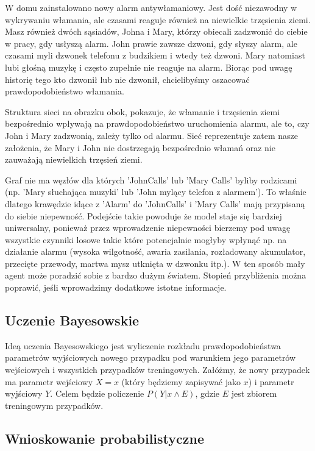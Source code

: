 \documentclass[a4paper,15pt]{article}
\begin{document}
W domu zainstalowano nowy alarm antywłamaniowy. Jest dość niezawodny w wykrywaniu włamania, ale czasami reaguje również na niewielkie trzęsienia ziemi. Masz również dwóch sąsiadów, Johna i Mary, którzy obiecali zadzwonić do ciebie w pracy, gdy usłyszą alarm. John prawie zawsze dzwoni, gdy słyszy alarm, ale czasami myli dzwonek telefonu z budzikiem i wtedy też dzwoni. Mary natomiast lubi głośną muzykę i często zupełnie nie reaguje na alarm. Biorąc pod uwagę historię tego kto dzwonił lub nie dzwonił, chcielibyśmy oszacować prawdopodobieństwo włamania.

Struktura sieci na obrazku obok, pokazuje, że włamanie i trzęsienia ziemi bezpośrednio wpływają na prawdopodobieństwo uruchomienia alarmu, ale to, czy John i Mary zadzwonią, zależy tylko od alarmu. Sieć reprezentuje zatem nasze założenia, że Mary i John nie dostrzegają bezpośrednio włamań oraz nie zauważają niewielkich trzęsień ziemi.

Graf nie ma węzłów dla których 'JohnCalls' lub 'Mary Calls' byliby rodzicami (np. 'Mary słuchająca muzyki' lub 'John mylący telefon z alarmem'). To właśnie dlatego krawędzie idące z 'Alarm' do 'JohnCalls' i 'Mary Calls' mają przypisaną do siebie niepewność. Podejście takie powoduje że model staje się bardziej uniwersalny, ponieważ przez wprowadzenie niepewności bierzemy pod uwagę wszystkie czynniki losowe takie które potencjalnie mogłyby wpłynąć np. na działanie alarmu (wysoka wilgotność, awaria zasilania, rozładowany akumulator, przecięte przewody, martwa mysz utknięta w dzwonku itp.). W ten sposób mały agent może poradzić sobie z bardzo dużym światem. Stopień przybliżenia można poprawić, jeśli wprowadzimy dodatkowe istotne informacje. 

\subsection{Uczenie Bayesowskie}

 Ideą uczenia Bayesowskiego jest wyliczenie rozkładu prawdopodobieństwa parametrów wyjściowych nowego przypadku pod warunkiem jego parametrów wejściowych i wszystkich przypadków treningowych. Załóżmy, że nowy przypadek ma parametr wejściowy $X=x$ (który będziemy zapisywać jako $x$) i parametr wyjściowy $Y$. Celem będzie policzenie $P(Y | x \wedge E)$, gdzie $E$ jest zbiorem treningowym przypadków. 


\subsection{Wnioskowanie probabilistyczne}
\end{document}
